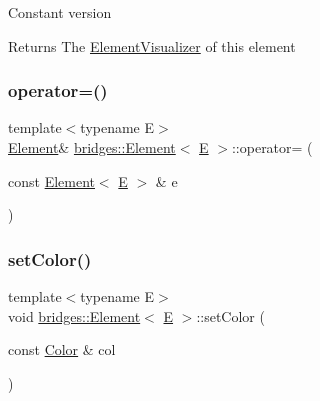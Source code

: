 Constant version

\begin{DoxyReturn}{Returns}
The \mbox{\hyperlink{classbridges_1_1_element_visualizer}{Element\+Visualizer}} of this element 
\end{DoxyReturn}
\mbox{\label{classbridges_1_1_element_a0f1b5a5688fe4db68f84969e93cea245}} 
\subsubsection{\texorpdfstring{operator=()}{operator=()}}
{\footnotesize\ttfamily template$<$typename E$>$ \\
\mbox{\hyperlink{classbridges_1_1_element}{Element}}\& \mbox{\hyperlink{classbridges_1_1_element}{bridges\+::\+Element}}$<$ \mbox{\hyperlink{namespacebridges_acfb0a4f7877d8f63de3e6862004c50eda3a3ea00cfc35332cedf6e5e9a32e94da}{E}} $>$\+::operator= (\begin{DoxyParamCaption}\item[{const \mbox{\hyperlink{classbridges_1_1_element}{Element}}$<$ \mbox{\hyperlink{namespacebridges_acfb0a4f7877d8f63de3e6862004c50eda3a3ea00cfc35332cedf6e5e9a32e94da}{E}} $>$ \&}]{e }\end{DoxyParamCaption})\hspace{0.3cm}{\ttfamily [inline]}}

\mbox{\label{classbridges_1_1_element_a0bb9291a0217ab222386572f76bb294c}} 
\subsubsection{\texorpdfstring{setColor()}{setColor()}\hspace{0.1cm}{\footnotesize\ttfamily [1/2]}}
{\footnotesize\ttfamily template$<$typename E$>$ \\
void \mbox{\hyperlink{classbridges_1_1_element}{bridges\+::\+Element}}$<$ \mbox{\hyperlink{namespacebridges_acfb0a4f7877d8f63de3e6862004c50eda3a3ea00cfc35332cedf6e5e9a32e94da}{E}} $>$\+::set\+Color (\begin{DoxyParamCaption}\item[{const \mbox{\hyperlink{classbridges_1_1_color}{Color}} \&}]{col }\end{DoxyParamCaption})\hspace{0.3cm}{\ttfamily [inline]}}

